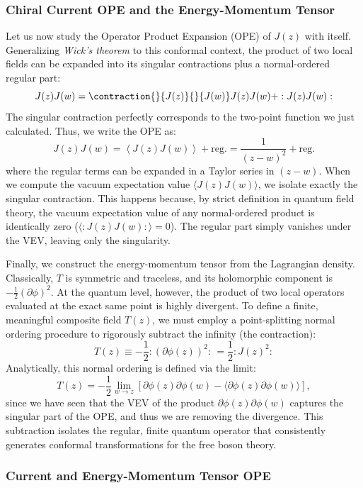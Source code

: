 \subsubsection{Chiral Current OPE and the Energy-Momentum Tensor}

Let us now study the Operator Product Expansion (OPE) of \(J(z)\) with itself. Generalizing \textit{Wick's theorem} to this conformal context, the product of two local fields can be expanded into its singular contractions plus a normal-ordered regular part:
\[
    J(z)J(w) = \contraction{}{J(z)}{}{J(w)} J(z) J(w) + :J(z)J(w):
\]
The singular contraction perfectly corresponds to the two-point function we just calculated. Thus, we write the OPE as:
\[
    J(z)J(w) = \left\langle J(z)J(w) \right\rangle + \text{reg.} = \frac{1}{(z-w)^2} + \text{reg.}
\]
where the regular terms can be expanded in a Taylor series in \((z-w)\). When we compute the vacuum expectation value \(\langle J(z)J(w) \rangle\), we isolate exactly the singular contraction. This happens because, by strict definition in quantum field theory, the vacuum expectation value of any normal-ordered product is identically zero (\(\langle :J(z)J(w): \rangle = 0\)). The regular part simply vanishes under the VEV, leaving only the singularity.

Finally, we construct the energy-momentum tensor from the Lagrangian density. Classically, \(T\) is symmetric and traceless, and its holomorphic component is \(-\frac{1}{2}(\partial\phi)^2\). At the quantum level, however, the product of two local operators evaluated at the exact same point is highly divergent. To define a finite, meaningful composite field \(T(z)\), we must employ a point-splitting normal ordering procedure to rigorously subtract the infinity (the contraction):
\[
    T(z) \equiv -\frac{1}{2} : (\partial\phi(z))^2 : \, = \frac{1}{2} : J(z)^2 :
\]
Analytically, this normal ordering is defined via the limit:
\[
    T(z) = -\frac{1}{2} \lim_{w \to z} \left[ \partial\phi(z)\partial\phi(w) - \langle \partial\phi(z)\partial\phi(w) \rangle \right],
\]
since we have seen that the VEV of the product \(\partial\phi(z)\partial\phi(w)\) captures the singular part of the OPE, and thus we are removing the divergence. This subtraction isolates the regular, finite quantum operator that consistently generates conformal transformations for the free boson theory.

\subsubsection{Current and Energy-Momentum Tensor OPE}


